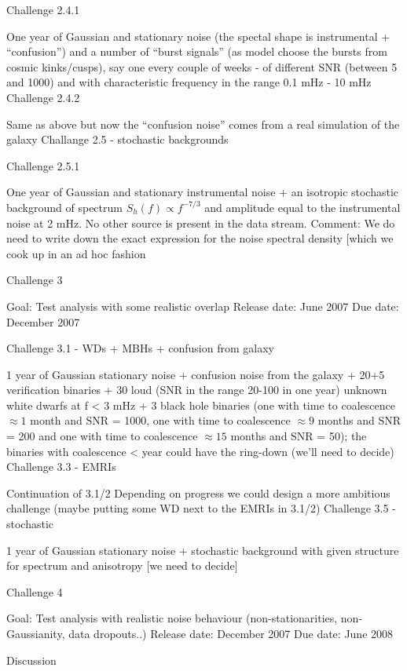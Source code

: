 \documentclass[11pt]{report}
\begin{document}
Challenge 2.4.1

One year of Gaussian and stationary noise (the spectal shape is instrumental + “confusion”) and a number of “burst signals” (as model choose the bursts from cosmic kinks/cusps), say one every couple of weeks - of different SNR (between 5 and 1000) and with characteristic frequency in the range 0.1 mHz - 10 mHz
Challenge 2.4.2

Same as above but now the “confusion noise” comes from a real simulation of the galaxy
Challange 2.5 - stochastic backgrounds

Challenge 2.5.1

One year of Gaussian and stationary instrumental noise + an isotropic stochastic background of spectrum $S_h(f) \propto f^{-7/3}$ and amplitude equal to the instrumental noise at 2 mHz. No other source is present in the data stream.
  Comment: We do need to write down the exact expression for the noise spectral density [which we cook up in an ad hoc fashion


Challenge 3

Goal: Test analysis with some realistic overlap 
Release date: June 2007 
Due date: December 2007 

Challenge 3.1 - WDs + MBHs + confusion from galaxy

1 year of Gaussian stationary noise + confusion noise from the galaxy + 20+5 verification binaries + 30 loud (SNR in the range 20-100 in one year) unknown white dwarfs at f < 3 mHz + 3 black hole binaries (one with time to coalescence $\approx 1$ month and SNR = 1000, one with time to coalescence $ \approx 9$ months and SNR = 200 and one with time to coalescence $\approx 15$ months and SNR = 50); the binaries with coalescence < year could have the ring-down (we’ll need to decide)
Challenge 3.3 - EMRIs

Continuation of 3.1/2
Depending on progress we could design a more ambitious challenge (maybe putting some WD next to the EMRIs in 3.1/2)
Challenge 3.5 - stochastic

1 year of Gaussian stationary noise + stochastic background with given structure for spectrum and anisotropy [we need to decide]


Challenge 4

Goal: Test analysis with realistic noise behaviour (non-stationarities, non-Gaussianity, data dropouts..) 
Release date: December 2007 
Due date: June 2008 



Discussion
\end{document}
